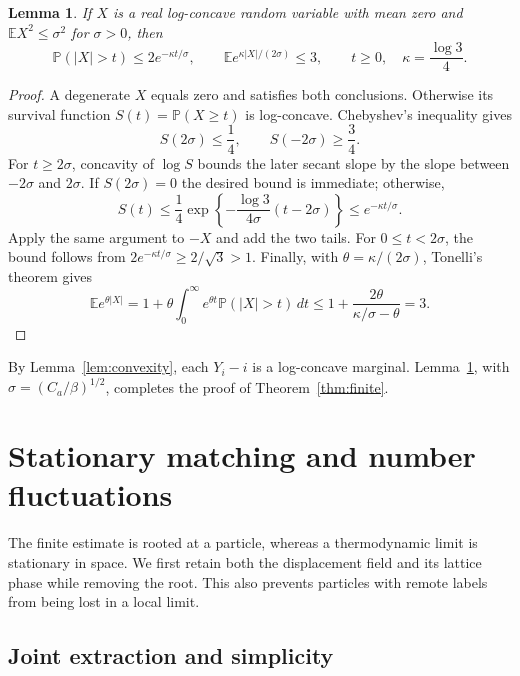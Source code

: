 \documentclass[11pt]{article}
\newtheorem{lemma}[theorem]{Lemma}
\theoremstyle{remark}\newtheorem{remark}[theorem]{Remark}
\newcommand{\E}{\mathbb E}
\newcommand{\Prob}{\mathbb P}
\begin{document}
\begin{lemma}\label{lem:exptail}
If $X$ is a real log-concave random variable with mean zero and
$\E X^2\le\sigma^2$ for $\sigma>0$, then
\[
 \Prob(|X|>t)\le2e^{-\kappa t/\sigma},\qquad
 \E e^{\kappa|X|/(2\sigma)}\le3,
                 \qquad t\ge0,\quad \kappa=\frac{\log3}{4}.
\]
\end{lemma}
\begin{proof}
A degenerate $X$ equals zero and satisfies both conclusions.
Otherwise its survival function $S(t)=\Prob(X\ge t)$ is
log-concave.  Chebyshev's inequality gives
\[
 S(2\sigma)\le\frac14,\qquad S(-2\sigma)\ge\frac34.
\]
For $t\ge2\sigma$, concavity of $\log S$ bounds the later
secant slope by the slope between $-2\sigma$ and $2\sigma$.
If $S(2\sigma)=0$ the desired bound is immediate; otherwise,
\[
 S(t)\le\frac14
       \exp\left\{-\frac{\log3}{4\sigma}(t-2\sigma)\right\}
       \le e^{-\kappa t/\sigma}.
\]
Apply the same argument to $-X$ and add the two tails.  For
$0\le t<2\sigma$, the bound follows from
$2e^{-\kappa t/\sigma}\ge2/\sqrt3>1$.
Finally, with $\theta=\kappa/(2\sigma)$, Tonelli's theorem gives
\[
 \E e^{\theta|X|}
   =1+\theta\int_0^\infty e^{\theta t}\Prob(|X|>t)\,dt
   \le1+\frac{2\theta}{\kappa/\sigma-\theta}=3.
\]
\end{proof}
By Lemma~\ref{lem:convexity}, each $Y_i-i$ is a log-concave
marginal.  Lemma~\ref{lem:exptail}, with
$\sigma=(C_a/\beta)^{1/2}$, completes the proof of
Theorem~\ref{thm:finite}.

\section{Stationary matching and number fluctuations}\label{sec:matching}

The finite estimate is rooted at a particle, whereas a thermodynamic
limit is stationary in space. We first retain both the displacement
field and its lattice phase while removing the root. This also
prevents particles with remote labels from being lost in a local
limit.

\subsection{Joint extraction and simplicity}
\end{document}
